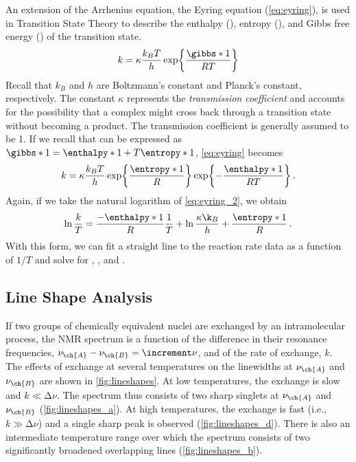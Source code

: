 \documentclass[nobib,nofonts,nols,nohyper]{tufte-handout}
\begin{document}
An extension of the Arrhenius equation, the Eyring equation (\cref{eq:eyring}), is used in Transition State Theory to describe the enthalpy (), entropy (), and Gibbs free energy () of the transition state. 
\begin{equation}
  k = \kappa \frac{k_B T}{h} \exp{\frac{\gibbs*{1}}{RT}}
  \label{eq:eyring}
\end{equation}
Recall that \( k_B \) and \( h \) are Boltzmann's constant and Planck's constant, respectively. 
The constant \( \kappa \) represents the \emph{transmission coefficient} and accounts for the possibility that a complex might cross back through a transition state without becoming a product. 
The transmission coefficient is generally assumed to be \num{1}. 
If we recall that  can be expressed as \( \gibbs*{1} = \enthalpy*{1} + T \entropy*{1} \), \cref{eq:eyring} becomes 
\begin{equation}
  k = \kappa \frac{k_B T}{h} \exp{\frac{\entropy*{1}}{R}} \exp{-\frac{\enthalpy*{1}}{R T}} \, .
  \label{eq:eyring_2}
\end{equation}
Again, if we take the natural logarithm of \cref{eq:eyring_2}, we obtain
\begin{equation}
  \ln{\frac{k}{T}} = \frac{-\enthalpy*{1}}{R} \frac{1}{T} 
    + \ln{\frac{\kappa \k_B}{h}} + \frac{\entropy*{1}}{R} \, .
  \label{eq:eyring_linear}
\end{equation}
With this form, we can fit a straight line to the reaction rate data as a function of \( 1/T \) and solve for , , and . 


\subsection{Line Shape Analysis} %
\label{sub:line_shape_analysis}

If two groups of chemically equivalent nuclei are exchanged by an intramolecular process, the NMR spectrum is a function of the difference in their resonance frequencies, \( \nu_{\ch{A}} - \nu_{\ch{B}} = \increment\nu \), and of the rate of exchange, \( k \). 
The effects of exchange at several temperatures on the linewidths at \( \nu_\ch{A} \) and \( \nu_\ch{B} \) are shown in \cref{fig:lineshapes}. 
At low temperatures, the exchange is slow and \( k \ll \increment\nu \). 
The spectrum thus consists of two sharp singlets at \( \nu_\ch{A} \) and \( \nu_\ch{B} \) (\cref{fig:lineshapes_a}). 
At high temperatures, the exchange is fast (i.e., \( k \gg \increment\nu \)) and a single sharp peak is observed (\cref{fig:lineshapes_d}). 
There is also an intermediate temperature range over which the spectrum consists of two significantly broadened overlapping lines (\cref{fig:lineshapes_b}).
\end{document}
